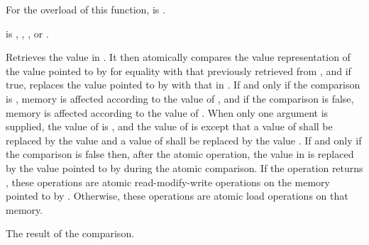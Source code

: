 \begin{itemdescr}
\pnum
\constraints
For the  overload of this function,
 is .

\pnum
\expects
{} is
,
,
, or
.

\pnum
\effects
Retrieves the value in . It then atomically
compares the value representation of the value pointed to by 
for equality with that previously retrieved from ,
and if true, replaces the value pointed to
by  with that in .
If and only if the comparison is , memory is affected according to the
value of , and if the comparison is false, memory is affected according
to the value of . When only one  argument is
supplied, the value of  is , and the value of
 is  except that a value of 
shall be replaced by the value  and a value of
 shall be replaced by the value
.
If and only if the comparison is false then, after the atomic operation,
the value in  is replaced by the value
pointed to by  during the atomic comparison.
If the operation returns , these
operations are atomic read-modify-write
operations on the memory
pointed to by .
Otherwise, these operations are atomic load operations on that memory.

\pnum
\returns
The result of the comparison.


\end{itemdescr}
